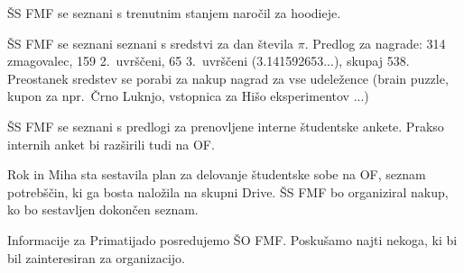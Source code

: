 \documentclass{seja}
\begin{document}
\begin{ad}
    \item
    ŠS FMF se seznani s trenutnim stanjem naročil za hoodieje.

    \item
    ŠS FMF se seznani seznani s sredstvi za dan števila $\pi$. Predlog za nagrade: 314 zmagovalec, 159 2.~uvrščeni, 65 3.~uvrščeni (3.141592653...), skupaj 538. Preostanek sredstev se porabi za nakup nagrad za vse udeležence (brain puzzle, kupon za npr.~Črno Luknjo, vstopnica za Hišo eksperimentov ...)

    \item
    ŠS FMF se seznani s predlogi za prenovljene interne študentske ankete. Prakso internih anket bi razširili tudi na OF.

    \item
    Rok in Miha sta sestavila plan za delovanje študentske sobe na OF, seznam potrebščin, ki ga bosta naložila na skupni Drive. ŠS FMF bo organiziral nakup, ko bo sestavljen dokončen seznam.

    Informacije za Primatijado posredujemo ŠO FMF. Poskušamo najti nekoga, ki bi bil zainteresiran za organizacijo.
\end{ad}
\end{document}
